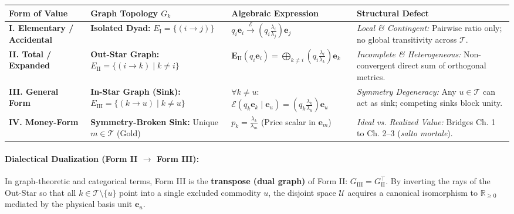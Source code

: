 \documentclass[11pt,a4paper]{article}
\begin{document}
\begin{center}
\renewcommand{\arraystretch}{1.4}
\begin{tabular}{@{}p{}p{}p{}p{}@{}}
\toprule
\textbf{Form of Value} & \textbf{Graph Topology $G_k$} & \textbf{Algebraic Expression} & \textbf{Structural Defect} \\
\midrule
\textbf{I. Elementary / Accidental} & \textbf{Isolated Dyad:} \newline $E_{\text{I}} = \{(i \to j)\}$ & $q_i \mathbf{e}_i \xrightarrow{\mathcal{E}} \left(q_i \frac{\lambda_i}{\lambda_j}\right) \mathbf{e}_j$ & \textit{Local \& Contingent:} Pairwise ratio only; no global transitivity across $\mathcal{T}$. \\
\textbf{II. Total / Expanded} & \textbf{Out-Star Graph:} \newline $E_{\text{II}} = \{(i \to k) \mid k \neq i\}$ & $\mathbf{E}_{\text{II}}(q_i \mathbf{e}_i) = \bigoplus_{k \neq i} \left(q_i \frac{\lambda_i}{\lambda_k}\right) \mathbf{e}_k$ & \textit{Incomplete \& Heterogeneous:} Non-convergent direct sum of orthogonal metrics. \\
\textbf{III. General Form} & \textbf{In-Star Graph (Sink):} \newline $E_{\text{III}} = \{(k \to u) \mid k \neq u\}$ & $\forall k \neq u:$ \newline $\mathcal{E}(q_k \mathbf{e}_k \mid \mathbf{e}_u) = \left(q_k \frac{\lambda_k}{\lambda_u}\right) \mathbf{e}_u$ & \textit{Symmetry Degeneracy:} Any $u \in \mathcal{T}$ can act as sink; competing sinks block unity. \\
\textbf{IV. Money-Form} & \textbf{Symmetry-Broken Sink:} \newline Unique $m \in \mathcal{T}$ (Gold) & $p_k = \frac{\lambda_k}{\lambda_m}$ \newline (Price scalar in $\mathbf{e}_m$) & \textit{Ideal vs. Realized Value:} Bridges Ch. 1 to Ch. 2--3 (\textit{salto mortale}). \\
\bottomrule
\end{tabular}
\end{center}

\paragraph{Dialectical Dualization (Form II $\to$ Form III):} In graph-theoretic and categorical terms, Form III is the \textbf{transpose (dual graph)} of Form II: $G_{\text{III}} = G_{\text{II}}^\top$. By inverting the rays of the Out-Star so that all $k \in \mathcal{T} \setminus \{u\}$ point into a single excluded commodity $u$, the disjoint space $\mathcal{U}$ acquires a canonical isomorphism to $\mathbb{R}_{\ge 0}$ mediated by the physical basis unit $\mathbf{e}_u$.
\end{document}
